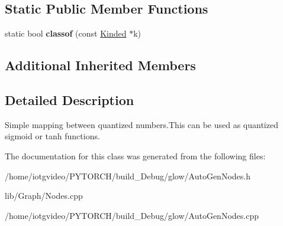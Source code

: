 \subsection*{Static Public Member Functions}
\begin{DoxyCompactItemize}
\item 
\mbox{\label{classglow_1_1_int_lookup_table_node_ac04f36bbe6fe4f369658dc633b612fef}} 
static bool {\bfseries classof} (const \hyperlink{classglow_1_1_kinded}{Kinded} $\ast$k)
\end{DoxyCompactItemize}
\subsection*{Additional Inherited Members}


\subsection{Detailed Description}
Simple mapping between quantized numbers.\+This can be used as quantized sigmoid or tanh functions. 

The documentation for this class was generated from the following files\+:\begin{DoxyCompactItemize}
\item 
/home/iotgvideo/\+P\+Y\+T\+O\+R\+C\+H/build\+\_\+\+Debug/glow/Auto\+Gen\+Nodes.\+h\item 
lib/\+Graph/Nodes.\+cpp\item 
/home/iotgvideo/\+P\+Y\+T\+O\+R\+C\+H/build\+\_\+\+Debug/glow/Auto\+Gen\+Nodes.\+cpp\end{DoxyCompactItemize}
